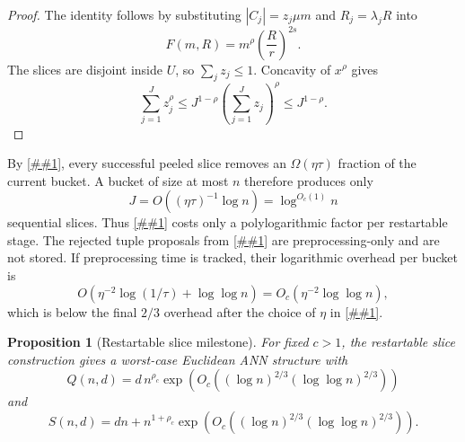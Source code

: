 \documentclass[10pt]{article}
\newcommand{\cref}[1]{\ref{##1}}
\newtheorem{proposition}[theorem]{Proposition}
\theoremstyle{definition}
\begin{document}
\begin{proof}
   The identity follows by substituting $|C_j|=z_j\mu m$ and $R_j=\lambda_jR$ into
   \[
      F(m,R)=m^\rho\left(\frac Rr\right)^{2s}.
   \]
   The slices are disjoint inside $U$, so $\sum_j z_j\le1$. Concavity of $x^\rho$ gives
   \[
      \sum_{j=1}^J z_j^\rho\le J^{1-\rho}\left(\sum_{j=1}^J z_j\right)^\rho\le J^{1-\rho}.
   \]
\end{proof}

By \cref{lem:tuple-cap-finder}, every successful peeled slice removes an $\Omega(\eta\tau)$ fraction of the current bucket. A bucket of size at most $n$ therefore produces only
\[
   J=O((\eta\tau)^{-1}\log n)=\log^{O_c(1)}n
\]
sequential slices. Thus \cref{lem:slice-budget} costs only a polylogarithmic factor per restartable stage.
The rejected tuple proposals from \cref{lem:tuple-cap-finder} are preprocessing-only and are not stored. If preprocessing time is tracked, their logarithmic overhead per bucket is
\[
   O(\eta^{-2}\log(1/\tau)+\log\log n)
   =
   O_c(\eta^{-2}\log\log n),
\]
which is below the final $2/3$ overhead after the choice of $\eta$ in \cref{prop:slice-two-thirds}.

\begin{proposition}[Restartable slice milestone]\label{prop:slice-two-thirds}
   For fixed $c>1$, the restartable slice construction gives a worst-case Euclidean ANN structure with
   \[
      Q(n,d)
      =
      d\,n^{\rho_c}
      \exp\!\left(
         O_c\!\left((\log n)^{2/3}(\log\log n)^{2/3}\right)
      \right)
   \]
   and
   \[
      S(n,d)
      =
      dn+n^{1+\rho_c}
      \exp\!\left(
         O_c\!\left((\log n)^{2/3}(\log\log n)^{2/3}\right)
      \right).
   \]
\end{proposition}
\end{document}

